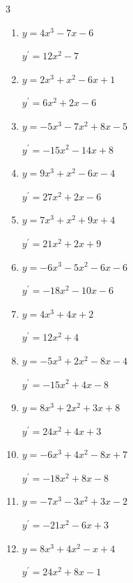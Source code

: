 \begin{multicols}{3}
\begin{enumerate}
        $\displaystyle y^{\prime}=-18x^{2}+4x-1$

  \item $y=4x^{3}-7x-6$

        $\displaystyle y^{\prime}=12x^{2}-7$

  \item $y=2x^{3}+x^{2}-6x+1$

        $\displaystyle y^{\prime}=6x^{2}+2x-6$

  \item $y=-5x^{3}-7x^{2}+8x-5$

        $\displaystyle y^{\prime}=-15x^{2}-14x+8$

  \item $y=9x^{3}+x^{2}-6x-4$

        $\displaystyle y^{\prime}=27x^{2}+2x-6$

  \item $y=7x^{3}+x^{2}+9x+4$

        $\displaystyle y^{\prime}=21x^{2}+2x+9$

  \item $y=-6x^{3}-5x^{2}-6x-6$

        $\displaystyle y^{\prime}=-18x^{2}-10x-6$

\columnbreak %

\resetques

  \item $y=4x^{3}+4x+2$

        $\displaystyle y^{\prime}=12x^{2}+4$

  \item $y=-5x^{3}+2x^{2}-8x-4$

        $\displaystyle y^{\prime}=-15x^{2}+4x-8$

  \item $y=8x^{3}+2x^{2}+3x+8$

        $\displaystyle y^{\prime}=24x^{2}+4x+3$

  \item $y=-6x^{3}+4x^{2}-8x+7$

        $\displaystyle y^{\prime}=-18x^{2}+8x-8$

  \item $y=-7x^{3}-3x^{2}+3x-2$

        $\displaystyle y^{\prime}=-21x^{2}-6x+3$

  \item $y=8x^{3}+4x^{2}-x+4$

        $\displaystyle y^{\prime}=24x^{2}+8x-1$


\end{enumerate}
\end{multicols}
